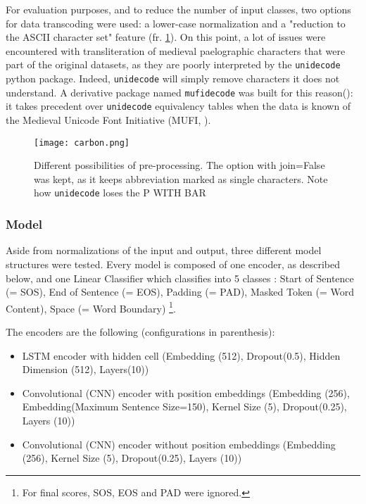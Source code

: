 \documentclass{jdmdh}
\begin{document}
For evaluation purposes, and to reduce the number of input classes, two options for data transcoding were used: a lower-case normalization and a "reduction to the ASCII character set" feature (fr. \ref{fig:normalization}). On this point, a lot of issues were encountered with transliteration of medieval paelographic characters that were part of the original datasets, as they are poorly interpreted by the \texttt{unidecode} python package. Indeed, \texttt{unidecode} will simply remove characters it does not understand. A derivative package named \texttt{mufidecode} was built for this reason(\citet{thibault_clerice_2019_3237731}): it takes precedent over \texttt{unidecode} equivalency tables when the data is known of the Medieval Unicode Font Initiative (MUFI, \citet{mufi}).

\begin{figure}[!ht]
  \centering
  \texttt{[image: carbon.png]}
  \caption{Different possibilities of pre-processing. The option with join=False was kept, as it keeps abbreviation marked as single characters. Note how \texttt{unidecode} loses the P WITH BAR}
  \label{fig:normalization}
\end{figure}

\subsubsection{Model}

Aside from normalizations of the input and output, three different model structures were tested. Every model is composed of one encoder, as described below, and one Linear Classifier which classifies into 5 classes : Start of Sentence (= SOS), End of Sentence (= EOS), Padding (= PAD), Masked Token (= Word Content), Space (= Word Boundary) \footnote{For final scores, SOS, EOS and PAD were ignored.}.

The encoders are the following (configurations in parenthesis):

\begin{itemize}
  \item LSTM encoder with hidden cell (Embedding (512), Dropout(0.5), Hidden Dimension (512), Layers(10))
  \item Convolutional (CNN) encoder with position embeddings (Embedding (256), Embedding(Maximum Sentence Size=150), Kernel Size (5), Dropout(0.25), Layers (10))
  \item Convolutional (CNN) encoder without position embeddings (Embedding (256), Kernel Size (5), Dropout(0.25), Layers (10))
\end{itemize}
\end{document}

